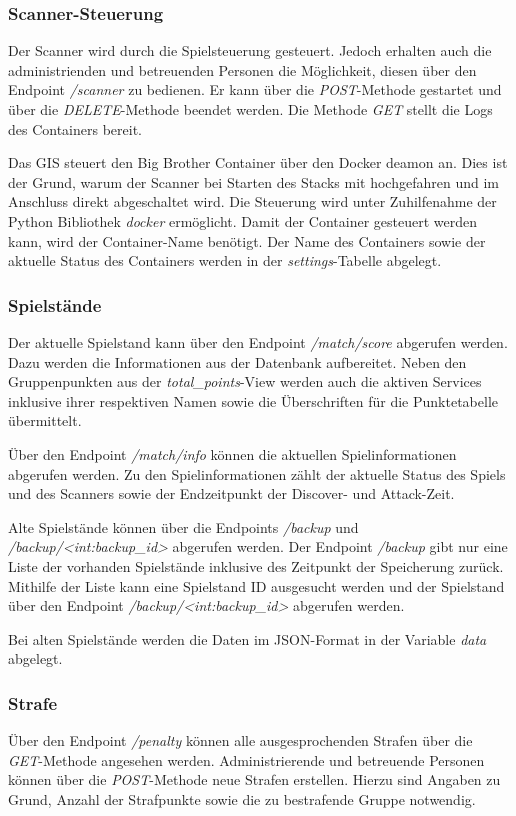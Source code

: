 \subsubsection{Scanner-Steuerung}
Der Scanner wird durch die Spielsteuerung gesteuert. Jedoch erhalten auch die administrienden und betreuenden Personen die Möglichkeit, diesen über den Endpoint \textit{/scanner} zu bedienen.
Er kann über die \textit{POST}-Methode gestartet und über die \textit{DELETE}-Methode beendet werden. Die Methode \textit{GET} stellt die Logs des Containers bereit.

Das GIS steuert den Big Brother Container über den Docker deamon an. Dies ist der Grund, warum der Scanner bei Starten des Stacks mit hochgefahren und im Anschluss direkt abgeschaltet wird. Die Steuerung wird unter Zuhilfenahme der Python Bibliothek \textit{docker} ermöglicht. Damit der Container gesteuert werden kann, wird der Container-Name benötigt. Der Name des Containers sowie der aktuelle Status des Containers werden in der \textit{settings}-Tabelle abgelegt.

\subsubsection{Spielstände}
Der aktuelle Spielstand kann über den Endpoint \textit{/match/score} abgerufen werden. Dazu werden die Informationen aus der Datenbank aufbereitet. Neben den Gruppenpunkten aus der \textit{total\_points}-View werden auch die aktiven Services inklusive ihrer respektiven Namen sowie die Überschriften für die Punktetabelle übermittelt.

Über den Endpoint \textit{/match/info} können die aktuellen Spielinformationen abgerufen werden. Zu den Spielinformationen zählt der aktuelle Status des Spiels und des Scanners sowie der Endzeitpunkt der Discover- und Attack-Zeit.

Alte Spielstände können über die Endpoints \textit{/backup} und \textit{/backup/<int:backup\_id>} abgerufen werden.
Der Endpoint \textit{/backup} gibt nur eine Liste der vorhanden Spielstände inklusive des Zeitpunkt der Speicherung zurück. Mithilfe der Liste kann eine Spielstand ID ausgesucht werden und der Spielstand über den Endpoint \textit{/backup/<int:backup\_id>} abgerufen werden.

Bei alten Spielstände werden die Daten im JSON-Format in der Variable \textit{data} abgelegt.

\subsubsection{Strafe}
Über den Endpoint \textit{/penalty} können alle ausgesprochenden Strafen über die \textit{GET}-Methode angesehen werden. Administrierende und betreuende Personen können über die \textit{POST}-Methode neue Strafen erstellen. Hierzu sind Angaben zu Grund, Anzahl der Strafpunkte sowie die zu bestrafende Gruppe notwendig.

